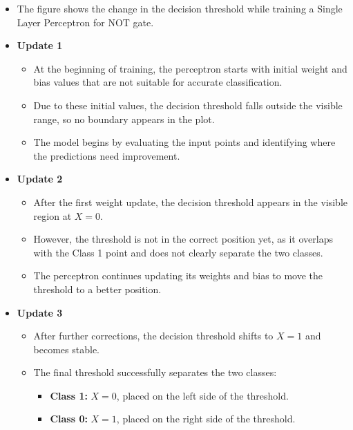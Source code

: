\documentclass[11pt]{article}
\begin{document}
\begin{enumerate}
\begin{itemize}
    \item The figure shows the change in the decision threshold while training a 
    Single Layer Perceptron for NOT gate.

    \item \textbf{Update 1}
    \begin{itemize}
        \item At the beginning of training, the perceptron starts with initial weight 
        and bias values that are not suitable for accurate classification.
        \item Due to these initial values, the decision threshold falls outside the 
        visible range, so no boundary appears in the plot.
        \item The model begins by evaluating the input points and identifying where 
        the predictions need improvement.
    \end{itemize}
\vspace{30mm}

    \item \textbf{Update 2}
    \begin{itemize}
        \item After the first weight update, the decision threshold appears in the visible 
        region at $X = 0$.

        \item However, the threshold is not in the correct position yet, as it overlaps with 
        the Class 1 point and does not clearly separate the two classes.

        \item The perceptron continues updating its weights and bias to move the threshold 
        to a better position.
    \end{itemize}

    \item \textbf{Update 3}
    \begin{itemize}
        \item After further corrections, the decision threshold shifts to $X = 1$ 
        and becomes stable.
        \item The final threshold successfully separates the two classes:
        \begin{itemize}
            \item\textbf{Class 1:} $X = 0$, placed on the left side of the threshold.
            
            \item\textbf{Class 0:} $X = 1$, placed on the right side of the threshold.
        \end{itemize}
    \end{itemize}

\end{itemize}
\vspace{10mm}
\end{enumerate}
\end{document}
